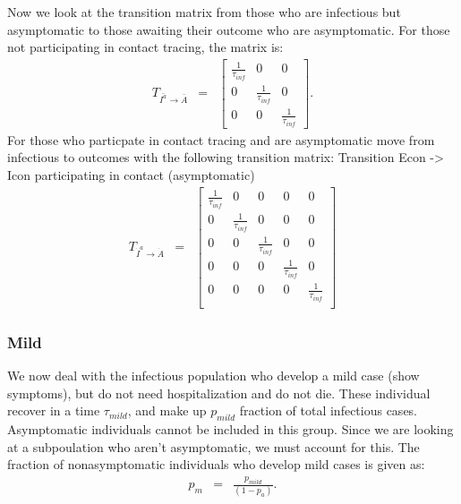 \documentclass{article}
\begin{document}
Now we look at the transition matrix from those who are infectious but asymptomatic to those awaiting their outcome who are asymptomatic. For those not participating in contact tracing, the matrix is:
\begin{eqnarray}
T_{\bar{I^{a}} \rightarrow \bar{A}} &=&
\begin{bmatrix}
\frac{1}{\tau_{inf}}  & 0                 & 0 \\ 
 0          &  \frac{1}{\tau_{inf}}  & 0 \\ 
 0          & 0                 &  \frac{1}{\tau_{inf}} 
\end{bmatrix}.
\end{eqnarray}
For those who particpate in contact tracing and are asymptomatic move from infectious to outcomes with the following transition matrix: 
Transition Econ -> Icon participating in contact (asymptomatic)
\begin{eqnarray}
T_{\dot{I}^{a} \rightarrow \dot{A}} &=&
\begin{bmatrix}
\frac{1}{\tau_{inf}}  & 0                 & 0 & 0 & 0\\ 
 0          &  \frac{1}{\tau_{inf}}  & 0 & 0 & 0 \\ 
 0          & 0                 &  \frac{1}{\tau_{inf}} & 0 & 0 \\ 
0           & 0                 &  0 & \frac{1}{\tau_{inf}} & 0 \\ 
0           & 0                 &  0 & 0 & \frac{1}{\tau_{inf}} \\
\end{bmatrix}
\end{eqnarray}

\subsubsection{Mild}

We now deal with the infectious population who develop a mild case (show symptoms), but do not need hospitalization and do not die. These individual recover in a time $\tau_{mild}$, and make up $p_{mild}$ fraction of total infectious cases. Asymptomatic individuals cannot be included in this group. Since we are looking at a subpoulation who aren't asymptomatic, we must account for this. The fraction of nonasymptomatic individuals who develop mild cases is given as:
\begin{eqnarray}
p_{m} &=& \frac{p_{mild}}{(1 - p_{a})}. 
\end{eqnarray}
\end{document}
